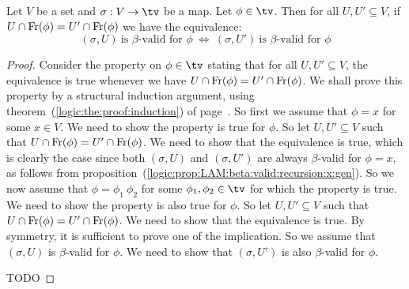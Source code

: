 \begin{prop}\label{logic:prop:LAM:free:support:U:U':beta:valid:gen}
    Let $V$ be a set and $\sigma:V\to\tv$ be a map. Let $\phi\in\tv$. Then 
    for all $U,U'\subseteq V$, if $U\cap\mbox{\rm Fr}(\phi)=U'\cap\mbox{\rm Fr}(\phi)$ we have 
    the equivalence:
        \[
            (\sigma,U)\ \mbox{is $\beta$-valid for $\phi$}\ 
            \Leftrightarrow\
            (\sigma,U')\ \mbox{is $\beta$-valid for $\phi$}
        \]
\end{prop}
\begin{proof}
    Consider the property on $\phi\in\tv$ stating that for all $U,U'\subseteq V$,
    the equivalence is true whenever we have $U\cap\mbox{\rm Fr}(\phi)=U'\cap\mbox{\rm Fr}(\phi)$.
    We shall prove this property by a structural induction argument, using 
    theorem~(\ref{logic:the:proof:induction})
    of page~\pageref{logic:the:proof:induction}. So first we assume that 
    $\phi=x$ for some $x\in V$. We need to show the property is true for
    $\phi$. So let $U,U'\subseteq V$ such that $U\cap\mbox{\rm Fr}(\phi)=U'\cap
    \mbox{\rm Fr}(\phi)$. We need to show that the equivalence is true, which is 
    clearly the case since both $(\sigma,U)$ and $(\sigma,U')$ are always
    $\beta$-valid for $\phi=x$, as follows from
    proposition~(\ref{logic:prop:LAM:beta:valid:recursion:x:gen}). So we
    now assume that $\phi=\phi_{1}\ \phi_{2}$ for some $\phi_{1},\phi_{2}\in
    \tv$ for which the property is true. We need to show the property is
    also true for $\phi$. So let $U,U'\subseteq V$ such that 
    $U\cap\mbox{\rm Fr}(\phi)=U'\cap\mbox{\rm Fr}(\phi)$. We need to show that the 
    equivalence is true. By symmetry, it is sufficient to prove one 
    of the implication. So we assume that $(\sigma,U)$ is $\beta$-valid
    for $\phi$. We need to show that $(\sigma,U')$ is also $\beta$-valid
    for $\phi$.

    TODO
\end{proof}


